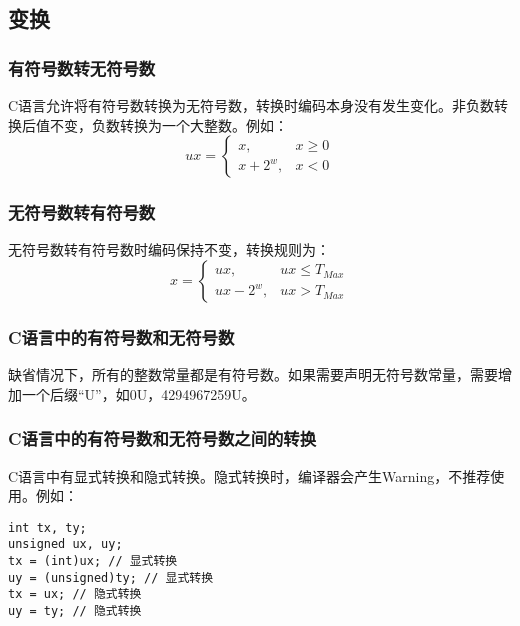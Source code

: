 \subsection{变换}
\subsubsection{有符号数转无符号数}
C语言允许将有符号数转换为无符号数，转换时编码本身没有发生变化。非负数转换后值不变，负数转换为一个大整数。例如：
\[ux=\begin{cases}x, & x\geq0\\x + 2^{w}, & x<0\end{cases}\]
\subsubsection{无符号数转有符号数}
无符号数转有符号数时编码保持不变，转换规则为：
\[x=\begin{cases}ux, & ux\leq T_{Max}\\ux - 2^{w}, & ux>T_{Max}\end{cases}\]
\subsubsection{C语言中的有符号数和无符号数}
缺省情况下，所有的整数常量都是有符号数。如果需要声明无符号数常量，需要增加一个后缀“U”，如0U，4294967259U。
\subsubsection{C语言中的有符号数和无符号数之间的转换}
C语言中有显式转换和隐式转换。隐式转换时，编译器会产生Warning，不推荐使用。例如：
\begin{verbatim}
int tx, ty;
unsigned ux, uy;
tx = (int)ux; // 显式转换
uy = (unsigned)ty; // 显式转换
tx = ux; // 隐式转换
uy = ty; // 隐式转换
\end{verbatim}
